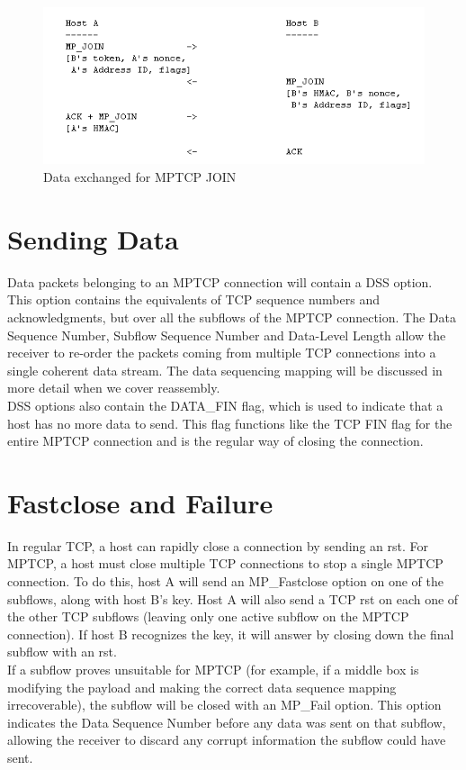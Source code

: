 \begin{figure}[!t]
\centering
\includegraphics[scale= 0.6]{Figures/mpjoinex.png}
\caption{Data exchanged for MPTCP JOIN}
\label{pic:mpjoinex}
\end{figure}

\section{Sending Data}
Data packets belonging to an MPTCP connection will contain a DSS option. This option contains the equivalents of TCP sequence numbers and acknowledgments, but over all the subflows of the MPTCP connection. The Data Sequence Number, Subflow Sequence Number and Data-Level Length allow the receiver to re-order the packets coming from multiple TCP connections into a single coherent data stream. The data sequencing mapping will be discussed in more detail when we cover reassembly. \\

DSS options also contain the DATA\_FIN flag, which is used to indicate that a host has no more data to send. This flag functions like the TCP FIN flag for the entire MPTCP connection and is the regular way of closing the connection.

\section{Fastclose and Failure}
In regular TCP, a host can rapidly close a connection by sending an rst. For MPTCP, a host must close multiple TCP connections to stop a single MPTCP connection. To do this, host A will send an MP\_Fastclose option on one of the subflows, along with host B's key. Host A will also send a TCP rst on each one of the other TCP subflows (leaving only one active subflow on the MPTCP connection). If host B recognizes the key, it will answer by closing down the final subflow with an rst. \\

If a subflow proves unsuitable for MPTCP (for example, if a middle box is modifying the payload and making the correct data sequence mapping irrecoverable), the subflow will be closed with an MP\_Fail option. This option indicates the Data Sequence Number before any data was sent on that subflow, allowing the receiver to discard any corrupt information the subflow could have sent.
